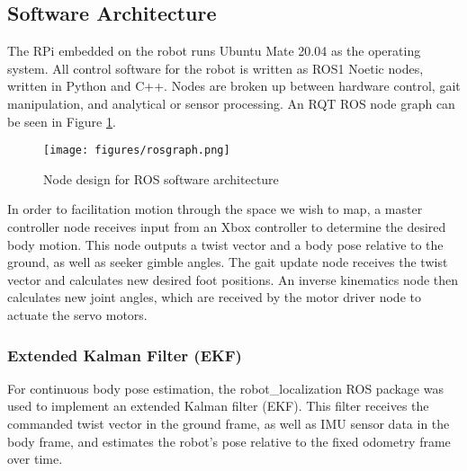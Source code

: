 \subsection{ Software Architecture }

The RPi embedded on the robot runs Ubuntu Mate 20.04 as the operating system. All control software for the robot is written as ROS1 Noetic nodes, written in Python and C++. Nodes are broken up between hardware control, gait manipulation, and analytical or sensor processing. An RQT ROS node graph can be seen in Figure \ref{fig:rqt}.


\begin{figure}[h]
    \centering
    \texttt{[image: figures/rosgraph.png]}
    \caption{ Node design for ROS software architecture }
    \label{fig:rqt}
\end{figure}

In order to facilitation motion through the space we wish to map, a master controller node receives input from an Xbox controller to determine the desired body motion. This node outputs a twist vector and a body pose relative to the ground, as well as seeker gimble angles. The gait update node receives the twist vector and calculates new desired foot positions. An inverse kinematics node then calculates new joint angles, which are received by the motor driver node to actuate the servo motors.

\subsubsection{ Extended Kalman Filter (EKF)}

For continuous body pose estimation, the robot\_localization ROS package \cite{robotlocalization} was used to implement an extended Kalman filter (EKF). This filter receives the commanded twist vector in the ground frame, as well as IMU sensor data in the body frame, and estimates the robot's pose relative to the fixed odometry frame over time.
